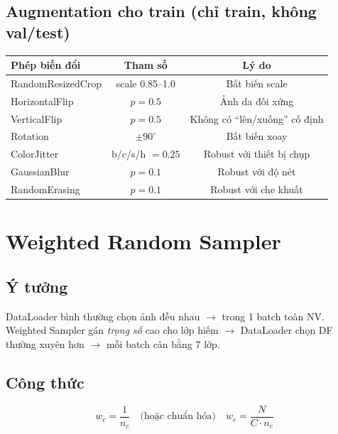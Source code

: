 \documentclass[11pt,a4paper]{article}
\begin{document}
\subsection{Augmentation cho train (chỉ train, không val/test)}

\begin{table}[h]
\centering\small
\begin{tabular}{lcc}
\toprule
\textbf{Phép biến đổi} & \textbf{Tham số} & \textbf{Lý do} \\
\midrule
RandomResizedCrop & scale 0.85--1.0   & Bất biến scale \\
HorizontalFlip    & $p=0.5$            & Ảnh da đối xứng \\
VerticalFlip      & $p=0.5$            & Không có ``lên/xuống'' cố định \\
Rotation          & $\pm 90^\circ$     & Bất biến xoay \\
ColorJitter       & b/c/s/h $= 0.25$   & Robust với thiết bị chụp \\
GaussianBlur      & $p=0.1$            & Robust với độ nét \\
RandomErasing     & $p=0.1$            & Robust với che khuất \\
\bottomrule
\end{tabular}
\end{table}

\section{Weighted Random Sampler}

\subsection{Ý tưởng}

\begin{simple}
DataLoader bình thường chọn ảnh đều nhau $\to$ trong 1 batch toàn NV. Weighted Sampler gán \textit{trọng số} cao cho lớp hiếm $\to$ DataLoader chọn DF thường xuyên hơn $\to$ mỗi batch cân bằng 7 lớp.
\end{simple}

\subsection{Công thức}

\[
  w_c = \frac{1}{n_c} \quad \text{(hoặc chuẩn hóa)} \quad w_c = \frac{N}{C \cdot n_c}
\]
\end{document}

